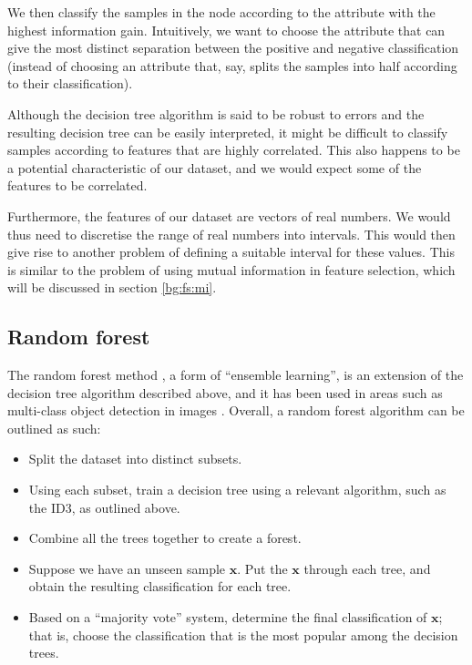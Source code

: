 \documentclass[12pt, twoside, a4paper]{report}
\begin{document}
We then classify the samples in the node according to the attribute with the highest information gain. Intuitively, we want to choose the attribute that can give the most distinct separation between the positive and negative classification (instead of choosing an attribute that, say, splits the samples into half  according to their classification).

Although the decision tree algorithm is said to be robust to errors \cite{RefWorks:98} and the resulting decision tree can be easily interpreted, it might be difficult to classify samples according to features that are highly correlated. This also happens to be a potential characteristic of our dataset, and we would expect some of the features to be correlated.

Furthermore, the features of our dataset are vectors of real numbers. We would thus need to discretise the range of real numbers into intervals. This would then give rise to another problem of defining a suitable interval for these values. This is similar to the problem of using mutual information in feature selection, which will be discussed in section \ref{bg:fs:mi}.

\subsection{Random forest}
The random forest method \cite{RefWorks:101}, a form of ``ensemble learning'', is an extension of the decision tree algorithm described above, and it has been used in areas such as multi-class object detection in images \cite{RefWorks:100}. Overall, a random forest algorithm can be outlined as such:
\begin{itemize}
\item Split the dataset into distinct subsets.
\item Using each subset, train a decision tree using a relevant algorithm, such as the ID3, as outlined above.
\item Combine all the trees together to create a forest.
\item Suppose we have an unseen sample $\boldsymbol x$.  Put the $\boldsymbol x$ through each tree, and obtain the resulting classification for each tree.
\item Based on a ``majority vote'' system, determine the final classification of $\boldsymbol x$; that is, choose the classification that is the most popular among the decision trees.
\end{itemize}
\end{document}
